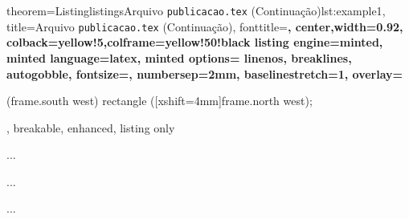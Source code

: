 \documentclass[10pt]{beamer}
\begin{document}
\begin{frame}{}
    \begin{tcblisting}{
        theorem={Listing}{listings}{Arquivo {\tt publicacao.tex} (Continuação)}{lst:example1},
        title=Arquivo {\tt publicacao.tex} (Continuação),
        fonttitle=\small\bfseries,
        center,width=0.92\paperwidth,
        colback=yellow!5,colframe=yellow!50!black
        listing engine=minted,
        minted language=latex,
        minted options={%
            linenos,
            breaklines,
            autogobble,
            fontsize=\small,
            numbersep=2mm,
            baselinestretch=1},
        overlay={%
        \begin{tcbclipinterior}
            \fill[gray!25] (frame.south west) rectangle ([xshift=4mm]frame.north west);
        \end{tcbclipinterior}},
        breakable, enhanced, listing only}
        ...
        \usepackage{rotating}
        \usepackage{dsfont}
        \usepackage{comment}
        
         
        
        \makeindex  
        ... 
         
        \maketitle  
        ...
    \end{tcblisting}
\end{frame}
\end{document}
